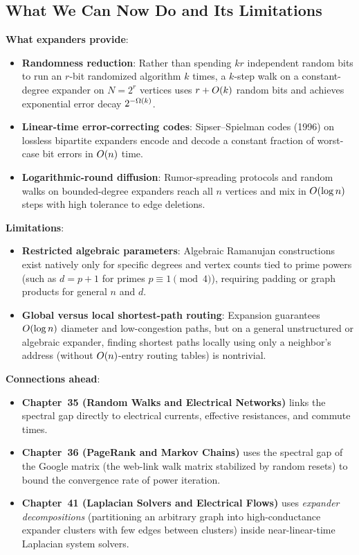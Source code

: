 \subsection{What We Can Now Do and Its Limitations}

\begin{focusbox}
\textbf{What expanders provide}:
\begin{itemize}
  \item \textbf{Randomness reduction}: Rather than spending $kr$ independent random bits to run an $r$-bit randomized algorithm $k$ times, a $k$-step walk on a constant-degree expander on $N=2^r$ vertices uses $r + O(k)$ random bits and achieves exponential error decay $2^{-\Omega(k)}$.
  \item \textbf{Linear-time error-correcting codes}: Sipser--Spielman codes (1996) on lossless bipartite expanders encode and decode a constant fraction of worst-case bit errors in $O(n)$ time.
  \item \textbf{Logarithmic-round diffusion}: Rumor-spreading protocols and random walks on bounded-degree expanders reach all $n$ vertices and mix in $O(\log n)$ steps with high tolerance to edge deletions.
\end{itemize}

\textbf{Limitations}:
\begin{itemize}
  \item \textbf{Restricted algebraic parameters}: Algebraic Ramanujan constructions exist natively only for specific degrees and vertex counts tied to prime powers (such as $d = p+1$ for primes $p \equiv 1 \pmod 4$), requiring padding or graph products for general $n$ and $d$.
  \item \textbf{Global versus local shortest-path routing}: Expansion guarantees $O(\log n)$ diameter and low-congestion paths, but on a general unstructured or algebraic expander, finding shortest paths locally using only a neighbor's address (without $O(n)$-entry routing tables) is nontrivial.
\end{itemize}

\textbf{Connections ahead}:
\begin{itemize}
  \item \textbf{Chapter~35 (Random Walks and Electrical Networks)} links the spectral gap directly to electrical currents, effective resistances, and commute times.
  \item \textbf{Chapter~36 (PageRank and Markov Chains)} uses the spectral gap of the Google matrix (the web-link walk matrix stabilized by random resets) to bound the convergence rate of power iteration.
  \item \textbf{Chapter~41 (Laplacian Solvers and Electrical Flows)} uses \emph{expander decompositions} (partitioning an arbitrary graph into high-conductance expander clusters with few edges between clusters) inside near-linear-time Laplacian system solvers.
\end{itemize}
\end{focusbox}


